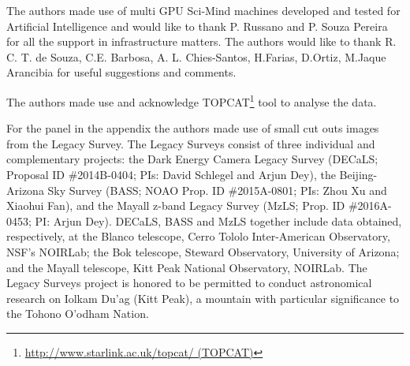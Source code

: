 \documentclass[fleqn,usenatbib]{mnras}
\begin{document}
The authors made use of multi GPU Sci-Mind machines developed and tested for Artificial Intelligence and would like to thank P. Russano and P. Souza Pereira for all the support in infrastructure matters. The authors would like to thank R. C. T. de Souza, C.E. Barbosa, A. L. Chies-Santos, H.Farias, D.Ortiz, M.Jaque Arancibia for useful suggestions and comments.

The authors made use and acknowledge TOPCAT\footnote{\url{http://www.starlink.ac.uk/topcat/ (TOPCAT)}} \citep{2005ASPC..347...29T}   tool to analyse the data.

 For the panel in the appendix the authors made use of small cut outs images from the Legacy Survey. The Legacy Surveys consist of three individual and complementary projects: the Dark Energy Camera Legacy Survey (DECaLS; Proposal ID \#2014B-0404; PIs: David Schlegel and Arjun Dey), the Beijing-Arizona Sky Survey (BASS; NOAO Prop. ID \#2015A-0801; PIs: Zhou Xu and Xiaohui Fan), and the Mayall z-band Legacy Survey (MzLS; Prop. ID \#2016A-0453; PI: Arjun Dey). DECaLS, BASS and MzLS together include data obtained, respectively, at the Blanco telescope, Cerro Tololo Inter-American Observatory, NSF’s NOIRLab; the Bok telescope, Steward Observatory, University of Arizona; and the Mayall telescope, Kitt Peak National Observatory, NOIRLab. The Legacy Surveys project is honored to be permitted to conduct astronomical research on Iolkam Du’ag (Kitt Peak), a mountain with particular significance to the Tohono O’odham Nation.
 
\clearpage

\newpage
\clearpage


\newpage
\clearpage



 


\appendix


\end{document}
